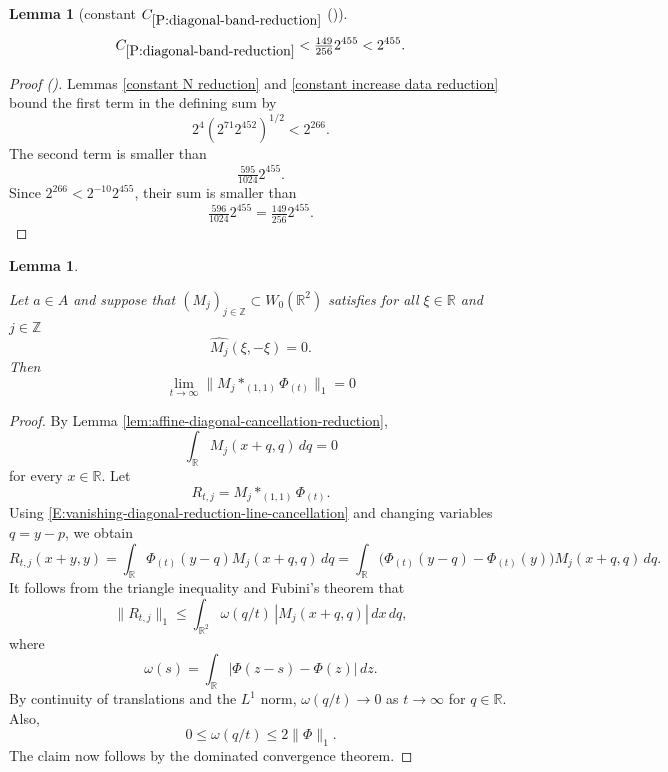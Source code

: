 \documentclass[12pt,reqno]{amsart}
\newcommand{\auto}{{({\tiny\faCar})}}
\theoremstyle{plain}
\newtheorem{lemma}[theorem]{Lemma}
\numberwithin{equation}{section}
\theoremstyle{remark}
\newcommand{\using}[1]{}
\newcommand{\Z}{{\mathbb Z}}
\newcommand{\R}{{\mathbb R}}
\begin{document}
\begin{lemma}[constant $C_{\ref{P:diagonal-band-reduction}}$ \auto]\label{constant diagonal band reduction}\using{constant N reduction}\using{constant increase data reduction}
\begin{equation}\label{constant diagonal band reduction bound}
C_{\ref{P:diagonal-band-reduction}}
<\tfrac{149}{256}2^{455}<2^{455}.
\end{equation}
\end{lemma}
\begin{proof}[Proof \auto]
Lemmas \ref{constant N reduction} and \ref{constant increase data reduction} bound the first term in the defining sum by
\[
2^4(2^{71}2^{452})^{1/2}<2^{266}.
\]
The second term is smaller than
\[
\tfrac{595}{1024}2^{455}.
\]
Since $2^{266}<2^{-10}2^{455}$, their sum is smaller than
\[
\tfrac{596}{1024}2^{455}
=\tfrac{149}{256}2^{455}.
\]
\end{proof}


\begin{lemma}\label{lem:L1-reduction}\using{lem:affine-diagonal-cancellation-reduction}

Let $a\in A$ and suppose that $(M_j)_{j\in\Z}\subset W_0(\R^2)$ satisfies for all $\xi \in \R$ and $j\in \Z$
\begin{equation}\label{auto:vanishing-diagonal-assumption}
\widehat{M_j}(\xi,-\xi)=0.
\end{equation}
Then
\begin{equation}\label{auto:vanishing-diagonal-large-scale-limit}    \lim_{t\to\infty}
    \| M_j\ast_{(1,1)}\Phi_{(t)} \|_1
    =0
    \end{equation}
\end{lemma}

\begin{proof}


By Lemma \ref{lem:affine-diagonal-cancellation-reduction},
\begin{equation}
    \label{E:vanishing-diagonal-reduction-line-cancellation}
    \int_{\mathbb R}M_j(x+q,q)\,dq=0
\end{equation}
for every \(x\in\mathbb R\).
Let
\[
R_{t,j}=M_j\ast_{(1,1)}\Phi_{(t)}.
\]
Using \eqref{E:vanishing-diagonal-reduction-line-cancellation} and
changing variables \(q=y-p\), we obtain
\[
R_{t,j}(x+y,y) = \int_{\mathbb R} \Phi_{(t)}(y-q)M_j(x+q,q)\,dq = \int_{\mathbb R} \bigl(\Phi_{(t)}(y-q)-\Phi_{(t)}(y)\bigr) M_j(x+q,q)\,dq.
\]
It follows from the triangle inequality and Fubini's theorem that
    \[
    \|R_{t,j}\|_1
    \le
    \int_{\mathbb R^2}
    \omega(q/t)\,
    |M_j(x+q,q)|\,dx\,dq,
    \]
    where
    \[
    \omega(s)
    =
    \int_{\mathbb R}|\Phi(z-s)-\Phi(z)|\,dz.
    \]
    By continuity of translations and the $L^1$ norm,
    \(\omega(q/t)\to0\) as \(t\to\infty\) for   \(q\in\mathbb R\).
    Also,
    \[
    0\le \omega(q/t)\le 2\|\Phi\|_1.
    \]
The claim now follows by the
    dominated convergence theorem.
\end{proof}
\end{document}
